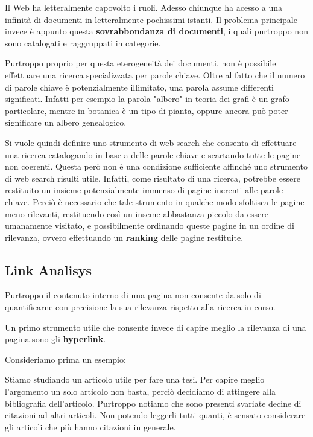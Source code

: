 Il Web ha letteralmente capovolto i ruoli. Adesso chiunque ha acesso a una infinità di documenti in letteralmente pochissimi istanti. Il problema principale invece è appunto questa \textbf{sovrabbondanza di documenti}, i quali purtroppo non sono catalogati e raggruppati in categorie.

Purtroppo proprio per questa eterogeneità dei documenti, non è possibile effettuare una ricerca specializzata per parole chiave. Oltre al fatto che il numero di parole chiave è potenzialmente illimitato, una parola assume differenti significati. Infatti per esempio la parola "albero" in teoria dei grafi è un grafo particolare, mentre in botanica è un tipo di pianta, oppure ancora può poter significare un albero genealogico.

Si vuole quindi definire uno strumento di web search che consenta di effettuare una ricerca catalogando in base a delle parole chiave e scartando tutte le pagine non coerenti. Questa però non è una condizione sufficiente affinché uno strumento di web search risulti utile. Infatti, come risultato di una ricerca, potrebbe essere restituito un insieme potenzialmente immenso di pagine inerenti alle parole chiave. Perciò è necessario che tale strumento in qualche modo sfoltisca le pagine meno rilevanti, restituendo così un inseme abbastanza piccolo da essere umanamente visitato, e possibilmente ordinando queste pagine in un ordine di rilevanza, ovvero effettuando un \textbf{ranking} delle pagine restituite.

\subsection{Link Analisys}

Purtroppo il contenuto interno di una pagina non consente da solo di quantificarne con precisione la sua rilevanza rispetto alla ricerca in corso.

Un primo strumento utile che consente invece di capire meglio la rilevanza di una pagina sono gli \textbf{hyperlink}. 

Consideriamo prima un esempio:

Stiamo studiando un articolo utile per fare una tesi. Per capire meglio l'argomento un solo articolo non basta, perciò decidiamo di attingere alla bibliografia dell'articolo. Purtroppo notiamo che sono presenti svariate decine di citazioni ad altri articoli. Non potendo leggerli tutti quanti, è sensato considerare gli articoli che più hanno citazioni in generale.

